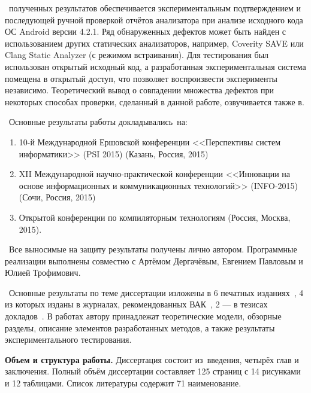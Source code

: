 \reliability\ полученных результатов обеспечивается экспериментальным подтверждением и последующей ручной проверкой отчётов анализатора при анализе исходного кода ОС Android версии 4.2.1. Ряд обнаруженных дефектов может быть найден с использованием других статических анализаторов, например, Coverity SAVE или Clang Static Analyzer (с режимом встраивания). Для тестирования был использован открытый исходный код, а разработанная экспериментальная система помещена в открытый доступ, что позволяет воспроизвести эксперименты независимо. Теоретический вывод о совпадении множества дефектов при некоторых способах проверки, сделанный в данной работе, озвучивается также в.

\probation\
Основные результаты работы докладывались~на:
\begin{enumerate}
 \item 10-й Международной Ершовской конференции <<Перспективы систем информатики>> (PSI 2015) (Казань, Россия, 2015)
 \item XII Международной научно-практической конференции <<Инновации на основе информационных и коммуникационных технологий>> (INFO-2015) (Сочи, Россия, 2015)
 \item Открытой конференции по компиляторным технологиям (Россия, Москва, 2015).
\end{enumerate}


\contribution\ Все выносимые на защиту результаты получены лично автором. Программные реализации выполнены совместно с Артёмом Дергачёвым, Евгением Павловым и Юлией Трофимович.

\publications\ Основные результаты по теме диссертации изложены в 6 печатных изданиях~\cite{summary-impl-mine,summary-intro-mine,summary-inter-unit-mine,summary-checkers-mine,info-2015,psi-2015},
4 из которых изданы в журналах, рекомендованных ВАК~\cite{summary-impl-mine,summary-intro-mine,summary-inter-unit-mine,summary-checkers-mine}, 
2 --- в тезисах докладов~\cite{info-2015,psi-2015}. В работах \cite{summary-impl-mine,summary-intro-mine,summary-inter-unit-mine,summary-checkers-mine} автору принадлежат теоретические модели, обзорные разделы, описание элементов разработанных методов, а также результаты экспериментального тестирования.

\textbf{Объем и структура работы.} Диссертация состоит из~введения, четырёх глав и заключения. Полный объём диссертации составляет 125 страниц с 14 рисунками и 12 таблицами. Список литературы содержит 71 наименование.

